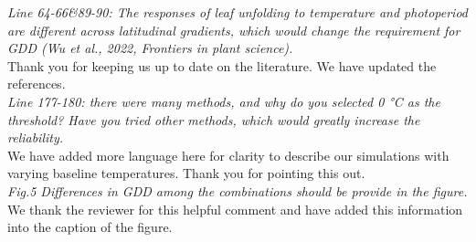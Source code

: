 \documentclass[11pt,a4paper]{article}\usepackage[]{graphicx}\usepackage[]{color}
\begin{document}
\textit{Line 64-66&89-90: The responses of leaf unfolding to temperature and photoperiod are different across latitudinal gradients, which would change the requirement for GDD (Wu et al., 2022, Frontiers in plant science).} \\

Thank you for keeping us up to date on the literature. We have updated the references. \\

\textit{Line 177-180: there were many methods, and why do you selected 0 °C as the threshold? Have you tried other methods, which would greatly increase the reliability.} \\

We have added more language here for clarity to describe our simulations with varying baseline temperatures. Thank you for pointing this out. \\

\textit{Fig.5 Differences in GDD among the combinations should be provide in the figure.} \\

We thank the reviewer for this helpful comment and have added this information into the caption of the figure.


\newpage

\end{document}
